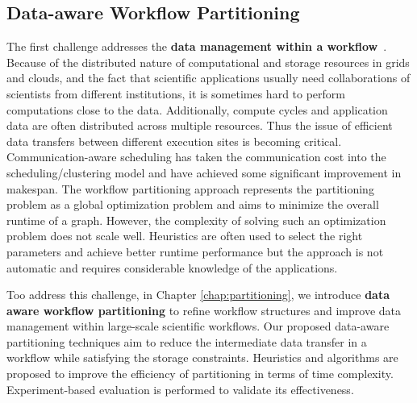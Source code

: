

\subsection{Data-aware Workflow Partitioning}

The first challenge addresses the \textbf{data management within a workflow}~\cite{wang2013supporting, wang2012scimate, wang2014removing}. 
Because of the distributed nature of computational and storage resources in grids and clouds, and the fact that scientific applications usually need collaborations of scientists from different institutions, it is sometimes hard to perform computations close to the data. Additionally, compute cycles and application data are often distributed across multiple resources. 
Thus the issue of efficient data transfers between different execution sites is becoming critical. 
Communication-aware scheduling \cite{Sonmez2006, Jones2004} has taken the communication cost into the scheduling/clustering model and have achieved some significant improvement in makespan. The workflow partitioning approach \cite{Hedayat2009, Yuan2010, Wieczorek2005,Rubing2005} represents the partitioning problem as a global optimization problem and aims to minimize the overall runtime of a graph. However, the complexity of solving such an optimization problem does not scale well. Heuristics \cite{Maheshwari2012, Callaghan2010} are often used to select the right parameters and achieve better runtime performance but the approach is not automatic and requires considerable knowledge of the applications. 

Too address this challenge, in Chapter \ref{chap:partitioning}, we introduce \textbf{data aware workflow partitioning} to refine workflow structures and improve data management within large-scale scientific workflows. 
Our proposed data-aware partitioning techniques aim to reduce the intermediate data transfer in a workflow while satisfying the storage constraints. Heuristics and algorithms are proposed to improve the efficiency of partitioning in terms of time complexity. Experiment-based evaluation is performed to validate its effectiveness.  

